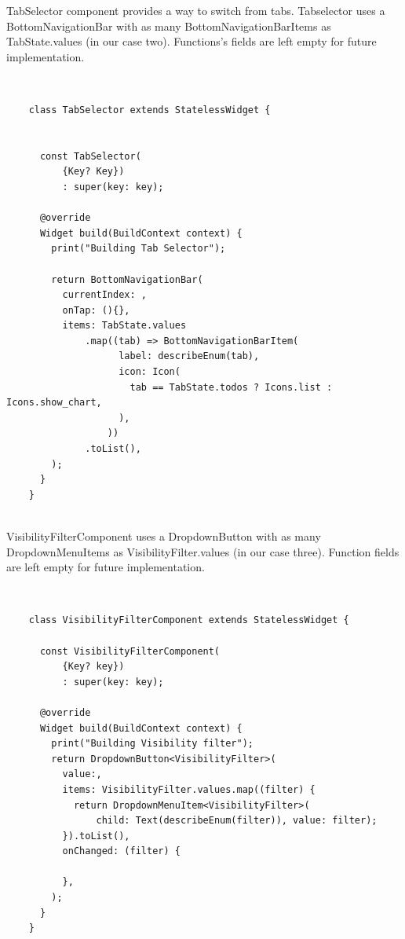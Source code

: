 	
	TabSelector component provides a way to switch from tabs. Tabselector uses a BottomNavigationBar with as many BottomNavigationBarItems as TabState.values (in our case two). Functions's fields are left empty for future implementation.
	
	\mbox{}\\
	\begin{code}
	 \mbox{}
			\label{code:2.11}
	\begin{verbatim}
	class TabSelector extends StatelessWidget {
	
	
	  const TabSelector(
	      {Key? Key})
	      : super(key: key);
	
	  @override
	  Widget build(BuildContext context) {
	    print("Building Tab Selector");
	
	    return BottomNavigationBar(
	      currentIndex: ,
	      onTap: (){},
	      items: TabState.values
	          .map((tab) => BottomNavigationBarItem(
	                label: describeEnum(tab),
	                icon: Icon(
	                  tab == TabState.todos ? Icons.list : Icons.show_chart,
	                ),
	              ))
	          .toList(),
	    );
	  }
	}
	
	\end{verbatim}
	\end{code}
	\mbox{}
	
	VisibilityFilterComponent uses a DropdownButton with as many DropdownMenuItems as VisibilityFilter.values (in our case three). Function fields are left empty for future implementation.
	
	\mbox{}\\
	\begin{code}
	 \mbox{}
			\label{code:2.12}
	\begin{verbatim}
	class VisibilityFilterComponent extends StatelessWidget {
	
	  const VisibilityFilterComponent(
	      {Key? key})
	      : super(key: key);
	
	  @override
	  Widget build(BuildContext context) {
	    print("Building Visibility filter");
	    return DropdownButton<VisibilityFilter>(
	      value:,
	      items: VisibilityFilter.values.map((filter) {
	        return DropdownMenuItem<VisibilityFilter>(
	            child: Text(describeEnum(filter)), value: filter);
	      }).toList(),
	      onChanged: (filter) {
	       
	      },
	    );
	  }
	}
	\end{verbatim}
	\end{code}
	\mbox{}
	
